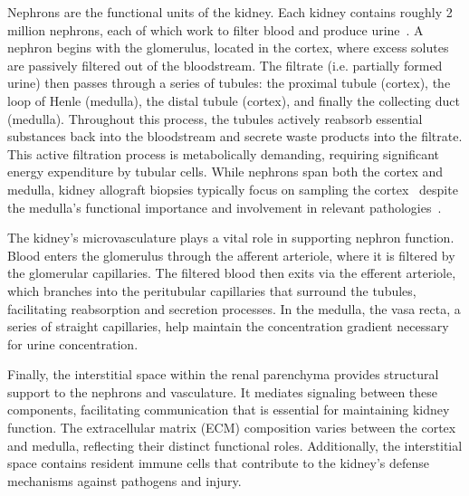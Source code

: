 Nephrons are the functional units of the kidney. Each kidney contains roughly 2 million nephrons, each of which work to filter blood and produce urine~\cite{shringi_EndStage_2026,fattah_How_2019}. A nephron begins with the glomerulus, located in the cortex, where excess solutes are passively filtered out of the bloodstream. The filtrate (i.e. partially formed urine) then passes through a series of tubules: the proximal tubule (cortex), the loop of Henle (medulla), the distal tubule (cortex), and finally the collecting duct (medulla). Throughout this process, the tubules actively reabsorb essential substances back into the bloodstream and secrete waste products into the filtrate. This active filtration process is metabolically demanding, requiring significant energy expenditure by tubular cells. While nephrons span both the cortex and medulla, kidney allograft biopsies typically focus on sampling the cortex~\cite{tsai_Current_2016} despite the medulla's functional importance and involvement in relevant pathologies~\cite{lopez_normal_2015,nankivell_Importance_2020,wei_Architecture_2015}.


The kidney's microvasculature plays a vital role in supporting nephron function. Blood enters the glomerulus through the afferent arteriole, where it is filtered by the glomerular capillaries. The filtered blood then exits via the efferent arteriole, which branches into the peritubular capillaries that surround the tubules, facilitating reabsorption and secretion processes. In the medulla, the vasa recta, a series of straight capillaries, help maintain the concentration gradient necessary for urine concentration.


Finally, the interstitial space within the renal parenchyma provides structural support to the nephrons and vasculature. It mediates signaling between these components, facilitating communication that is essential for maintaining kidney function. The extracellular matrix (ECM) composition varies between the cortex and medulla, reflecting their distinct functional roles. Additionally, the interstitial space contains resident immune cells that contribute to the kidney's defense mechanisms against pathogens and injury.


